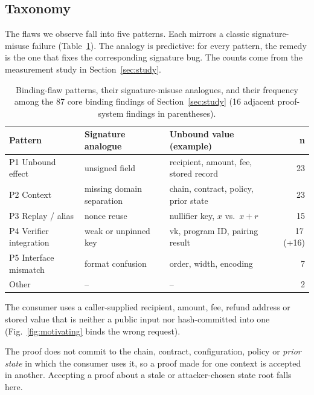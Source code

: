 \subsection{Taxonomy}\label{sec:def-taxonomy}

The flaws we observe fall into five patterns. Each mirrors a classic
signature-misuse failure (Table~\ref{tab:taxonomy}). The analogy is
predictive: for every pattern, the remedy is the one that fixes the
corresponding signature bug. The counts come from the measurement study in
Section~\ref{sec:study}.

\begin{table}[t]
\centering
\caption{Binding-flaw patterns, their signature-misuse analogues, and their
frequency among the 87 core binding findings of Section~\ref{sec:study}
(16 adjacent proof-system findings in parentheses).}
\label{tab:taxonomy}
\footnotesize
\setlength{\tabcolsep}{3pt}
\begin{tabular}{@{}p{2.0cm}p{1.75cm}p{2.45cm}r@{}}
\toprule
\textbf{Pattern} & \textbf{Signature analogue} & \textbf{Unbound value (example)} & \textbf{n} \\
\midrule
P1 Unbound effect & unsigned field & recipient, amount, fee, stored record & 23 \\
P2 Context & missing domain separation & chain, contract, policy, prior state & 23 \\
P3 Replay / alias & nonce reuse & nullifier key, $x$ vs.\ $x{+}r$ & 15 \\
P4 Verifier integration & weak or unpinned key & vk, program ID, pairing result & 17\,(+16) \\
P5 Interface mismatch & format confusion & order, width, encoding & 7 \\
Other & -- & -- & 2 \\
\bottomrule
\end{tabular}
\end{table}

The consumer uses a caller-supplied recipient, amount, fee, refund address or
stored value that is neither a public input nor hash-committed into one
(Fig.~\ref{fig:motivating} binds the wrong request).

The proof does not commit to the chain, contract, configuration, policy or
\emph{prior state} in which the consumer uses it, so a proof made for one
context is accepted in another. Accepting a proof about a stale or
attacker-chosen state root falls here.

